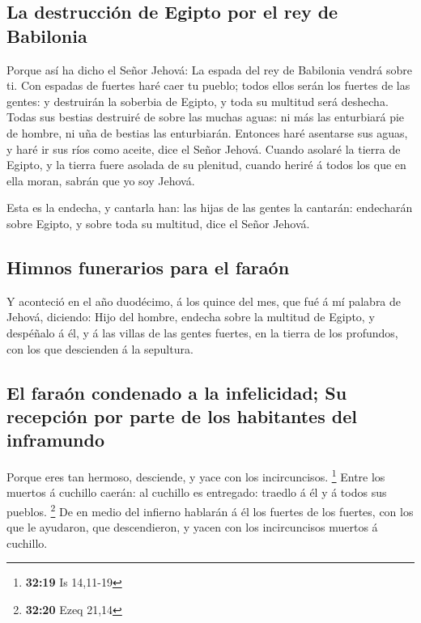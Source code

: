 \hypertarget{la-destrucciuxf3n-de-egipto-por-el-rey-de-babilonia}{%
\subsection{La destrucción de Egipto por el rey de
Babilonia}\label{la-destrucciuxf3n-de-egipto-por-el-rey-de-babilonia}}

 Porque así ha dicho el Señor Jehová: La espada del rey
de Babilonia vendrá sobre ti.  Con espadas de fuertes
haré caer tu pueblo; todos ellos serán los fuertes de las gentes: y
destruirán la soberbia de Egipto, y toda su multitud será deshecha.
 Todas sus bestias destruiré de sobre las muchas aguas:
ni más las enturbiará pie de hombre, ni uña de bestias las enturbiarán.
 Entonces haré asentarse sus aguas, y haré ir sus ríos
como aceite, dice el Señor Jehová.  Cuando asolaré la
tierra de Egipto, y la tierra fuere asolada de su plenitud, cuando
heriré á todos los que en ella moran, sabrán que yo soy Jehová.

 Esta es la endecha, y cantarla han: las hijas de las
gentes la cantarán: endecharán sobre Egipto, y sobre toda su multitud,
dice el Señor Jehová.

\hypertarget{himnos-funerarios-para-el-farauxf3n}{%
\subsection{Himnos funerarios para el
faraón}\label{himnos-funerarios-para-el-farauxf3n}}

 Y aconteció en el año duodécimo, á los quince del mes,
que fué á mí palabra de Jehová, diciendo:  Hijo del
hombre, endecha sobre la multitud de Egipto, y despéñalo á él, y á las
villas de las gentes fuertes, en la tierra de los profundos, con los que
descienden á la sepultura.

\hypertarget{el-farauxf3n-condenado-a-la-infelicidad-su-recepciuxf3n-por-parte-de-los-habitantes-del-inframundo}{%
\subsection{El faraón condenado a la infelicidad; Su recepción por parte
de los habitantes del
inframundo}\label{el-farauxf3n-condenado-a-la-infelicidad-su-recepciuxf3n-por-parte-de-los-habitantes-del-inframundo}}

 Porque eres tan hermoso, desciende, y yace con los
incircuncisos. \footnote{\textbf{32:19} Is 14,11-19} 
Entre los muertos á cuchillo caerán: al cuchillo es entregado: traedlo á
él y á todos sus pueblos. \footnote{\textbf{32:20} Ezeq 21,14}
 De en medio del infierno hablarán á él los fuertes de
los fuertes, con los que le ayudaron, que descendieron, y yacen con los
incircuncisos muertos á cuchillo.

